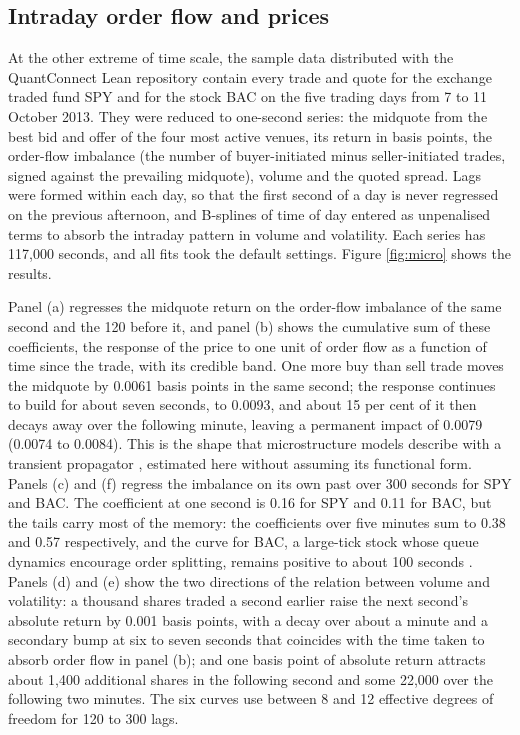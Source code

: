 \documentclass[11pt]{article}
\begin{document}
\subsection{Intraday order flow and prices}

At the other extreme of time scale, the sample data distributed with the
QuantConnect Lean repository contain every trade and quote for the exchange
traded fund SPY and for the stock BAC on the five trading days from 7 to 11
October 2013. They were reduced to one-second series: the midquote from the
best bid and offer of the four most active venues, its return in basis
points, the order-flow imbalance (the number of buyer-initiated minus
seller-initiated trades, signed against the prevailing midquote), volume and
the quoted spread. Lags were formed within each day, so that the first second
of a day is never regressed on the previous afternoon, and B-splines of time
of day entered as unpenalised terms to absorb the intraday pattern in volume
and volatility. Each series has 117,000 seconds, and all fits took the
default settings. Figure \ref{fig:micro} shows the results.

Panel (a) regresses the midquote return on the order-flow imbalance of the
same second and the 120 before it, and panel (b) shows the cumulative sum of
these coefficients, the response of the price to one unit of order flow as a
function of time since the trade, with its credible band. One more buy than
sell trade moves the midquote by 0.0061 basis points in the same second; the
response continues to build for about seven seconds, to 0.0093, and about 15
per cent of it then decays away over the following minute, leaving a
permanent impact of 0.0079 (0.0074 to 0.0084). This is the shape that
microstructure models describe with a transient propagator
\citep{hasbrouck1991, bouchaud2004}, estimated here without assuming its
functional form. Panels (c) and (f) regress the imbalance on its own past
over 300 seconds for SPY and BAC. The coefficient at one second is 0.16 for
SPY and 0.11 for BAC, but the tails carry most of the memory: the
coefficients over five minutes sum to 0.38 and 0.57 respectively, and the
curve for BAC, a large-tick stock whose queue dynamics encourage order
splitting, remains positive to about 100 seconds \citep{lillo2004}. Panels
(d) and (e) show the two directions of the relation between volume and
volatility: a thousand shares traded a second earlier raise the next second's
absolute return by 0.001 basis points, with a decay over about a minute and a
secondary bump at six to seven seconds that coincides with the time taken to
absorb order flow in panel (b); and one basis point of absolute return attracts
about 1,400 additional shares in the following second and some 22,000 over
the following two minutes. The six curves use between 8 and 12 effective
degrees of freedom for 120 to 300 lags.
\end{document}
